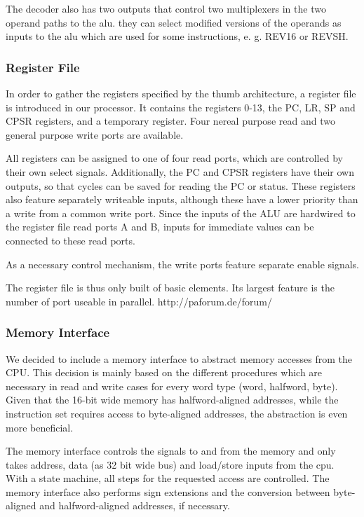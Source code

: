 The decoder also has two outputs that control two multiplexers in the two operand paths to the alu. they can select modified versions of the operands as inputs to the alu which are used for some instructions, e. g. REV16 or REVSH.

\subsubsection{Register File}
\label{subsubsec:regfisterfile}
In order to gather the registers specified by the thumb architecture, a register file is introduced in our processor. It contains the registers 0-13, the PC, LR, SP and CPSR registers, and a temporary register. Four nereal purpose read and two general purpose write ports are available.

All registers can be assigned to one of four read ports, which are controlled by their own select signals. Additionally, the PC and CPSR registers have their own outputs, so that cycles can be saved for reading the PC or status. These registers also feature separately writeable inputs, although these have a lower priority than a write from a common write port.
Since the inputs of the ALU are hardwired to the register file read ports A and B, inputs for immediate values can be connected to these read ports.

As a necessary control mechanism, the write ports feature separate enable signals.

The register file is thus only built of basic elements. Its largest feature is the number of port useable in parallel. 
http://paforum.de/forum/
\subsubsection{Memory Interface}
\label{subsubsec:memoryinterface}
We decided to include a memory interface to abstract memory accesses from the CPU. This decision is mainly based on the different procedures which are necessary in read and write cases for every word type (word, halfword, byte). Given that the 16-bit wide memory has halfword-aligned addresses, while the instruction set requires access to byte-aligned addresses, the abstraction is even more beneficial. 

The memory interface controls the signals to and from the memory and only takes address, data (as 32 bit wide bus) and load/store inputs from the cpu. With a state machine, all steps for the requested access are controlled. The memory interface also performs sign extensions and the conversion between byte-aligned and halfword-aligned addresses, if necessary.

